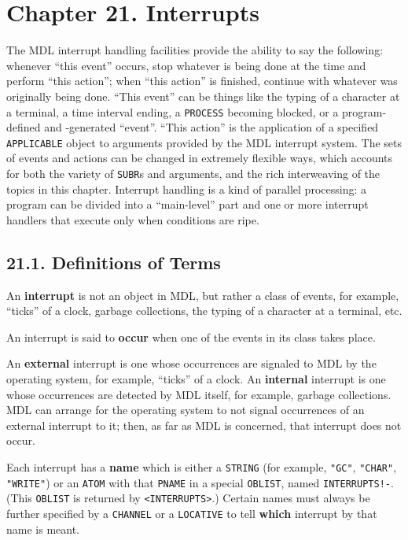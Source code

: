 \documentclass[a4paper,]{article}
\begin{document}
\section{Chapter 21. Interrupts}\label{chapter-21.-interrupts}

The MDL interrupt handling facilities provide the ability to say the following: whenever ``this event'' occurs, stop
whatever is being done at the time and perform ``this action''; when ``this action'' is finished, continue with whatever
was originally being done. ``This event'' can be things like the typing of a character at a terminal, a time interval
ending, a \texttt{PROCESS} becoming blocked, or a program-defined and -generated ``event''. ``This action'' is the
application of a specified \texttt{APPLICABLE} object to arguments provided by the MDL interrupt system. The sets of events
and actions can be changed in extremely flexible ways, which accounts for both the variety of \texttt{SUBR}s and arguments,
and the rich interweaving of the topics in this chapter. Interrupt handling is a kind of parallel processing: a program can
be divided into a ``main-level'' part and one or more interrupt handlers that execute only when conditions are ripe.

\subsection{21.1. Definitions of Terms}\label{definitions-of-terms}

An \textbf{interrupt} is not an object in MDL, but rather a class of events, for example, ``ticks'' of a clock, garbage
collections, the typing of a character at a terminal, etc.

An interrupt is said to \textbf{occur} when one of the events in its class takes place.

An \textbf{external} interrupt is one whose occurrences are signaled to MDL by the operating system, for example, ``ticks''
of a clock. An \textbf{internal} interrupt is one whose occurrences are detected by MDL itself, for example, garbage
collections. MDL can arrange for the operating system to not signal occurrences of an external interrupt to it; then, as
far as MDL is concerned, that interrupt does not occur.

Each interrupt has a \textbf{name} which is either a \texttt{STRING} (for example, \texttt{"GC"}, \texttt{"CHAR"},
\texttt{"WRITE"}) or an \texttt{ATOM} with that \texttt{PNAME} in a special \texttt{OBLIST}, named
\texttt{INTERRUPTS!-}. (This \texttt{OBLIST} is returned by
\texttt{\textless{}INTERRUPTS\textgreater{}}.) Certain names must always be further specified by a \texttt{CHANNEL} or a
\texttt{LOCATIVE} to tell \textbf{which} interrupt by that name is meant.
\end{document}

